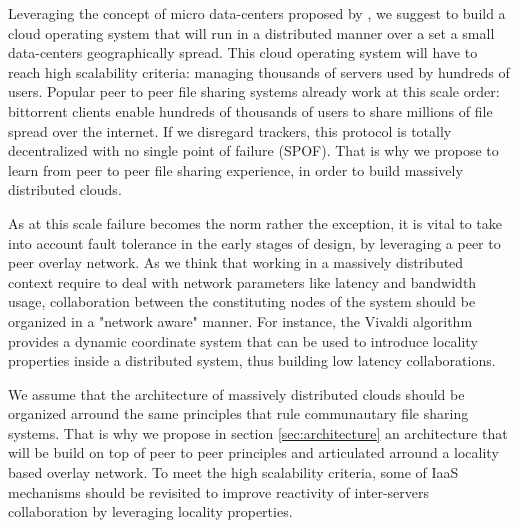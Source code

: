 Leveraging the concept of micro data-centers proposed by \cite{greenberg:2008},
we suggest to build a cloud operating system that will run in a distributed
manner over a set a small data-centers geographically spread. This cloud 
operating system will have to reach high scalability criteria: managing 
thousands of servers used by hundreds of users. Popular peer to peer file
sharing systems already work at this scale order: bittorrent clients enable 
hundreds of thousands of users to share millions of file spread over the 
internet. If we disregard trackers, this protocol is totally decentralized with 
no single point of failure (SPOF). That is why we propose to learn from peer to 
peer file sharing experience, in order to build massively distributed clouds.

As at this scale failure becomes the norm rather the exception, it is vital to
take into account fault tolerance in the early stages of design, by leveraging a
peer to peer overlay network. As we think that working in a massively
distributed context require to deal with network parameters like 
latency and bandwidth usage, collaboration between the constituting nodes of the
system should be organized in a "network aware" manner. For instance, the 
Vivaldi algorithm \cite{dabek:2004:vivaldi} provides a dynamic coordinate system
that can be used to introduce locality properties inside a distributed system, 
thus building low latency collaborations.

We assume that the architecture of massively distributed clouds should be 
organized arround the same principles that rule communautary file sharing 
systems. That is why we propose in section \ref{sec:architecture} an 
architecture that will be build on top of peer to peer principles and 
articulated arround a locality based overlay network. To meet the high 
scalability criteria, some of IaaS mechanisms should be revisited to improve 
reactivity of inter-servers collaboration by leveraging locality properties.



